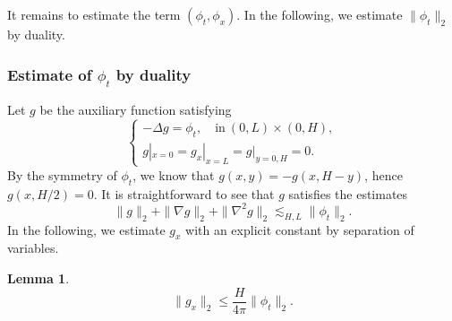 \documentclass[reqno, 11pt]{amsart}
\theoremstyle{plain}
\newtheorem{lemma}[theorem]{Lemma}
\theoremstyle{definition}
\theoremstyle{remark}
\numberwithin{equation}{section}
\begin{document}
It remains to estimate the term $(\phi_t, \phi_x)$. In the following, we estimate $\|\phi_t\|_2$ by duality.

\subsubsection{Estimate of $\phi_t$ by duality}

Let $g$ be the auxiliary function satisfying
$$
\left\{
\begin{aligned}
-\Delta g = \phi_t, \quad \mbox{in}~(0,L)\times(0,H),\\
g|_{x=0} = g_x|_{x=L} = g|_{y=0,H} = 0.
\end{aligned}
\right.
$$
By the symmetry of $\phi_t$, we know that $g(x,y) = -g(x,H-y)$, hence $g(x , H/2) = 0$. It is straightforward to see that $g$ satisfies the estimates
\begin{equation}\label{est:g_basic}
\|g\|_2 + \| \nabla g\|_2 + \| \nabla^2 g\|_2 \lesssim_{H,L} \| \phi_t\|_2.
\end{equation}
In the following, we estimate $g_x$ with an explicit constant by separation of variables.

\begin{lemma}
\begin{equation}\label{est:g_x}
\|g_x\|_2 \le \frac{H}{4\pi} \|\phi_t\|_2.
\end{equation}
\end{lemma}
\end{document}
